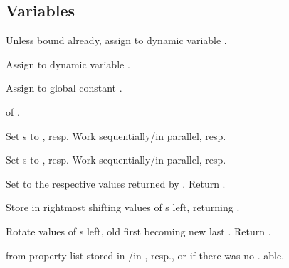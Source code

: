 \subsection{Variables}

\begin{LIST}{1cm}

   Unless bound
  already, assign  to dynamic variable .

   Assign
   to dynamic variable .

   Assign
   to global constant .

   of .

  Set s to , resp. Work sequentially/in
  parallel, resp. 

  Set s to , resp. Work sequentially/in
  parallel, resp. 

  Set  to the respective values returned by
  . Return .

   Store  in
  rightmost  shifting values of s left, returning
  .

   Rotate values of s left,
  old first becoming new last . Return \retval{\NIL}.

  \label{:property_lists}
   from property list stored in
  /in , resp., or  if
  there was no . able.


\end{LIST}
